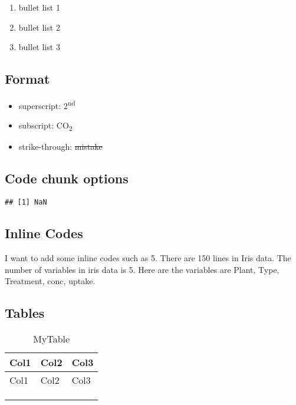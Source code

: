\documentclass[
]{article}
\providecommand{\tightlist}{%
  \setlength{\itemsep}{0pt}\setlength{\parskip}{0pt}}
\begin{document}
\begin{enumerate}
\def\labelenumi{\Roman{enumi}.}
\item
  bullet list 1
\item
  bullet list 2
\item
  bullet list 3
\end{enumerate}

\hypertarget{format}{%
\subsection{Format}\label{format}}

\begin{itemize}
\tightlist
\item
  superscript: 2\textsuperscript{nd}
\item
  subscript: CO\textsubscript{2}
\item
  strike-through: \st{mistake}
\end{itemize}

\hypertarget{code-chunk-options}{%
\subsection{Code chunk options}\label{code-chunk-options}}

\begin{verbatim}
## [1] NaN
\end{verbatim}

\hypertarget{inline-codes}{%
\subsection{Inline Codes}\label{inline-codes}}

I want to add some inline codes such as 5. There are 150 lines in Iris data. The number of variables in iris data is 5. Here are the variables are Plant, Type, Treatment, conc, uptake.

\hypertarget{tables}{%
\subsection{Tables}\label{tables}}

\begin{longtable}[]{@{}lll@{}}
\caption{MyTable}\tabularnewline
\toprule\noalign{}
Col1 & Col2 & Col3 \\
\midrule\noalign{}
\endfirsthead
\toprule\noalign{}
Col1 & Col2 & Col3 \\
\midrule\noalign{}
\endhead
\bottomrule\noalign{}
\endlastfoot
& & \\
& & \\
& & \\
\end{longtable}
\end{document}
